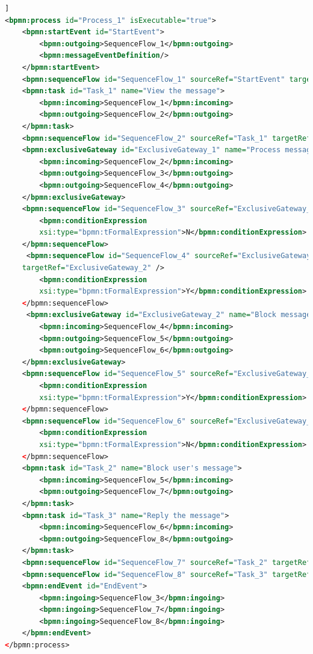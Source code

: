 \documentclass[runningheads]{llncs}
\begin{document}
\begin{lstlisting}[language={XML}]]
<bpmn:process id="Process_1" isExecutable="true">
	<bpmn:startEvent id="StartEvent">
        <bpmn:outgoing>SequenceFlow_1</bpmn:outgoing>
        <bpmn:messageEventDefinition/>
    </bpmn:startEvent>
    <bpmn:sequenceFlow id="SequenceFlow_1" sourceRef="StartEvent" targetRef="Task_1" />
    <bpmn:task id="Task_1" name="View the message">
        <bpmn:incoming>SequenceFlow_1</bpmn:incoming>
        <bpmn:outgoing>SequenceFlow_2</bpmn:outgoing>
    </bpmn:task>
    <bpmn:sequenceFlow id="SequenceFlow_2" sourceRef="Task_1" targetRef="ExclusiveGateway_1" />
    <bpmn:exclusiveGateway id="ExclusiveGateway_1" name="Process message?">
        <bpmn:incoming>SequenceFlow_2</bpmn:incoming>
        <bpmn:outgoing>SequenceFlow_3</bpmn:outgoing>
        <bpmn:outgoing>SequenceFlow_4</bpmn:outgoing>
    </bpmn:exclusiveGateway>
    <bpmn:sequenceFlow id="SequenceFlow_3" sourceRef="ExclusiveGateway_1" targetRef="EndEvent"/>
        <bpmn:conditionExpression 
        xsi:type="bpmn:tFormalExpression">N</bpmn:conditionExpression>
    </bpmn:sequenceFlow>
     <bpmn:sequenceFlow id="SequenceFlow_4" sourceRef="ExclusiveGateway_1"
    targetRef="ExclusiveGateway_2" />
        <bpmn:conditionExpression 
        xsi:type="bpmn:tFormalExpression">Y</bpmn:conditionExpression>
    </bpmn:sequenceFlow>
     <bpmn:exclusiveGateway id="ExclusiveGateway_2" name="Block message?">
        <bpmn:incoming>SequenceFlow_4</bpmn:incoming>
        <bpmn:outgoing>SequenceFlow_5</bpmn:outgoing>
        <bpmn:outgoing>SequenceFlow_6</bpmn:outgoing>
    </bpmn:exclusiveGateway>
    <bpmn:sequenceFlow id="SequenceFlow_5" sourceRef="ExclusiveGateway_2" targetRef="Task_2" />
        <bpmn:conditionExpression 
        xsi:type="bpmn:tFormalExpression">Y</bpmn:conditionExpression>
    </bpmn:sequenceFlow>
    <bpmn:sequenceFlow id="SequenceFlow_6" sourceRef="ExclusiveGateway_2" targetRef="Task_3" />
        <bpmn:conditionExpression 
        xsi:type="bpmn:tFormalExpression">N</bpmn:conditionExpression>
    </bpmn:sequenceFlow>
    <bpmn:task id="Task_2" name="Block user's message">
        <bpmn:incoming>SequenceFlow_5</bpmn:incoming>
        <bpmn:outgoing>SequenceFlow_7</bpmn:outgoing>
    </bpmn:task>
    <bpmn:task id="Task_3" name="Reply the message">
        <bpmn:incoming>SequenceFlow_6</bpmn:incoming>
        <bpmn:outgoing>SequenceFlow_8</bpmn:outgoing>
    </bpmn:task>
    <bpmn:sequenceFlow id="SequenceFlow_7" sourceRef="Task_2" targetRef="EndEvent" />
    <bpmn:sequenceFlow id="SequenceFlow_8" sourceRef="Task_3" targetRef="EndEvent" />
    <bpmn:endEvent id="EndEvent">
        <bpmn:ingoing>SequenceFlow_3</bpmn:ingoing>
        <bpmn:ingoing>SequenceFlow_7</bpmn:ingoing>
        <bpmn:ingoing>SequenceFlow_8</bpmn:ingoing>
    </bpmn:endEvent> 
</bpmn:process>
\end{lstlisting}
\end{document}
